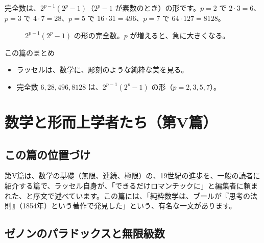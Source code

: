 \documentclass[a4paper,11pt,openany]{ltjsbook}
\begin{document}
完全数は、$2^{p-1}(2^p-1)$（$2^p-1$ が素数のとき）の形です。$p=2$ で $2\cdot3=6$、$p=3$ で $4\cdot7=28$、$p=5$ で $16\cdot31=496$、$p=7$ で $64\cdot127=8128$。

\begin{figure}[htbp]
\centering
{}
\caption{$2^{p-1}(2^p-1)$ の形の完全数。$p$ が増えると、急に大きくなる。}
\end{figure}

\begin{pointbox}{この篇のまとめ}
\begin{itemize}[leftmargin=*]
\item ラッセルは、数学に、彫刻のような純粋な美を見る。
\item 完全数 $6,28,496,8128$ は、$2^{p-1}(2^p-1)$ の形（$p=2,3,5,7$）。
\end{itemize}
\end{pointbox}

\chapter{数学と形而上学者たち（第V篇）}

\section{この篇の位置づけ}

第V篇は、数学の基礎（無限、連続、極限）の、19世紀の進歩を、一般の読者に紹介する篇で、ラッセル自身が、「できるだけロマンチックに」と編集者に頼まれた、と序文で述べています。この篇には、「純粋数学は、ブールが『思考の法則』（1854年）という著作で発見した」という、有名な一文があります。

\section{ゼノンのパラドックスと無限級数}
\end{document}
